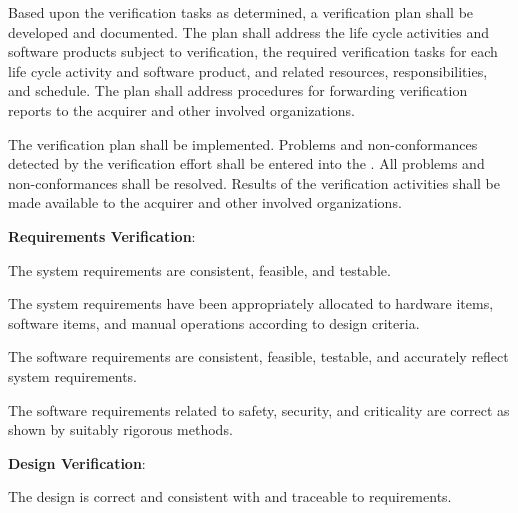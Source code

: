 \begin{adjustwidth}{2em}{0pt}
\begin{compactenum}
\begin{compactenum}
						\item Based upon the verification tasks as determined, a verification plan shall be developed and documented. The plan shall address the life cycle activities and software products subject to verification, the required verification tasks for each life cycle activity and software product, and related resources, responsibilities, and schedule. The plan shall address procedures for forwarding verification reports to the acquirer and other involved organizations.

						\item The verification plan shall be implemented. Problems and non-conformances detected by the verification effort shall be entered into the . All problems and non-conformances shall be resolved. Results of the verification activities shall be made available to the acquirer and other involved organizations.

					\end{compactenum}

					\item {\bf Requirements Verification}:

					\begin{compactenum}

						\item The system requirements are consistent, feasible, and testable.

						\item The system requirements have been appropriately allocated to hardware items, software items, and manual operations according to design criteria.

						\item The software requirements are consistent, feasible, testable, and accurately reflect system requirements.

						\item The software requirements related to safety, security, and criticality are correct as shown by suitably rigorous methods.

					\end{compactenum}

					\item {\bf Design Verification}:

					\begin{compactenum}

						\item The design is correct and consistent with and traceable to requirements.


\end{compactenum}
\end{compactenum}
\end{adjustwidth}
